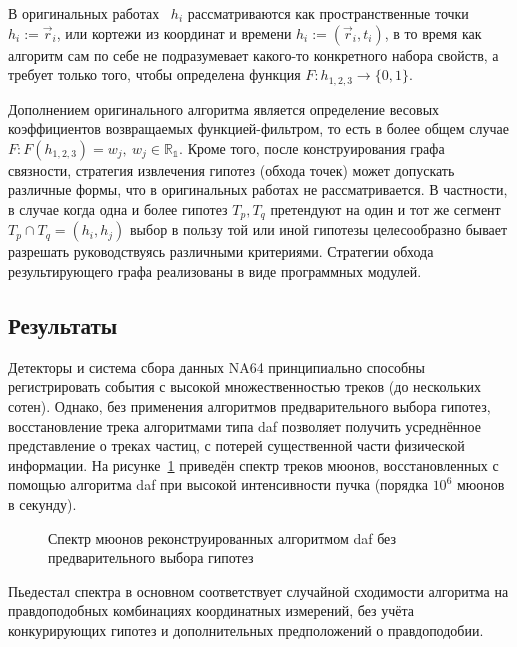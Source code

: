 В оригинальных работах~\cite{catsc-JINR, catsc-discrete, catsc-nim, catsc-disto}
$h_i$ рассматриваются как пространственные точки $h_i:=\vec{r}_i$, или кортежи из
координат и времени $h_i:=(\vec{r}_i,t_i)$, в то время как алгоритм сам по себе
не подразумевает какого-то конкретного набора свойств, а требует
только того, чтобы определена функция $F:h_{1,2,3} \rightarrow \{0,1\}$.

Дополнением оригинального алгоритма является определение весовых
коэффициентов возвращаемых функцией-фильтром, то есть в более общем
случае $F: F(h_{1,2,3}) =w_j, ~w_j \in \mathbb{R_1}$. Кроме того, после
конструирования графа связности, стратегия извлечения гипотез (обхода точек)
может допускать различные формы, что в оригинальных работах не
рассматривается. В частности, в случае когда одна и более гипотез $T_p, T_q$
претендуют на один и тот же сегмент $T_p \cap T_q = (h_i, h_j)$ выбор в пользу
той или иной гипотезы целесообразно бывает разрешать руководствуясь различными
критериями. Стратегии обхода результирующего графа реализованы в виде
программных модулей.

\subsection{Результаты}

Детекторы и система сбора данных NA64 принципиально способны
регистрировать события с высокой множественностью треков
(до нескольких сотен). Однако, без применения алгоритмов
предварительного выбора гипотез, восстановление
трека алгоритмами типа \acrshort{daf} позволяет получить усреднённое представление
о треках частиц, с потерей существенной части физической информации.
На рисунке~\ref{fig:muon-momenta-test-histogram}
приведён спектр треков мюонов, восстановленных с помощью алгоритма
\acrshort{daf} при высокой интенсивности пучка
(порядка $10^6$ мюонов в секунду).
\begin{figure}[h]
    \caption{Спектр мюонов реконструированных алгоритмом \acrshort{daf} без
    предварительного выбора гипотез}
    \label{fig:muon-momenta-test-histogram}
\end{figure}
Пьедестал спектра в основном соответствует случайной сходимости
алгоритма на правдоподобных комбинациях координатных измерений,
без учёта конкурирующих гипотез и дополнительных предположений о
правдоподобии.

